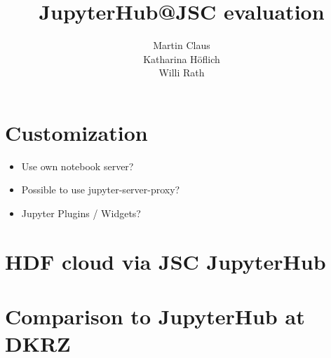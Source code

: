 \documentclass[11pt,a4paper]{article}
\title{\textbf{JupyterHub@JSC evaluation}}
\author{
  Martin Claus \\ %
	Katharina Höflich \\
	Willi Rath}
\begin{document}
\maketitle
\tableofcontents


%














\section{Customization}
\label{s-customization}

\begin{itemize}
	\item Use own notebook server?
  \item Possible to use jupyter-server-proxy?
  \item Jupyter Plugins / Widgets?
\end{itemize}


\section{HDF cloud via JSC JupyterHub}
\label{s-hdfcloud-jsc-jhub}


\section{Comparison to JupyterHub at DKRZ}
\label{s-comparison-dkrz}












\end{document}
